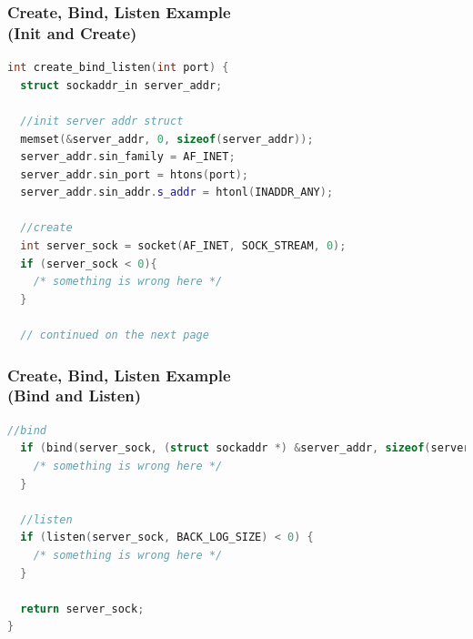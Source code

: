 \documentclass[aspectratio=43]{beamer}
\begin{document}
\begin{frame}[fragile]
  \frametitle{Create, Bind, Listen Example\\ (Init and Create)}

  \begin{lstlisting}[language=C++,basicstyle=\ttfamily\footnotesize,commentstyle=\color{commgreen},keywordstyle=\color{blue},breaklines=true]
int create_bind_listen(int port) {
  struct sockaddr_in server_addr;

  //init server addr struct
  memset(&server_addr, 0, sizeof(server_addr));
  server_addr.sin_family = AF_INET;
  server_addr.sin_port = htons(port);
  server_addr.sin_addr.s_addr = htonl(INADDR_ANY);

  //create
  int server_sock = socket(AF_INET, SOCK_STREAM, 0);
  if (server_sock < 0){
    /* something is wrong here */
  }

  // continued on the next page
  \end{lstlisting}
\end{frame}

\begin{frame}[fragile]
  \frametitle{Create, Bind, Listen Example\\ (Bind and Listen)}

  \begin{lstlisting}[language=C++,basicstyle=\ttfamily\footnotesize,commentstyle=\color{commgreen},keywordstyle=\color{blue},breaklines=true]
  //bind
  if (bind(server_sock, (struct sockaddr *) &server_addr, sizeof(server_addr)) < 0) {
    /* something is wrong here */
  }
	    
  //listen
  if (listen(server_sock, BACK_LOG_SIZE) < 0) {
    /* something is wrong here */           
  }

  return server_sock;
}
  \end{lstlisting}
\end{frame}
\end{document}
